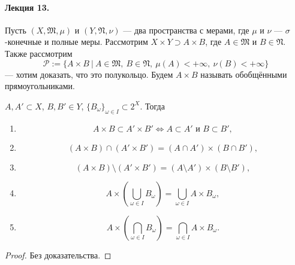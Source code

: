 \paragraph{Лекция 13.}

Пусть $(X, \mathfrak{M}, \mu)$ и $(Y, \mathfrak{N}, \nu)$ — два пространства с мерами, где $\mu$ и $\nu$ — $\sigma$-конечные и полные меры.
Рассмотрим $X \times Y \supset A \times B$, где $A \in \mathfrak{M}$ и $B \in \mathfrak{N}$.
Также рассмотрим
\[\mathcal{P}:=\{A \times B \ | \ A \in \mathfrak{M}, \ B \in \mathfrak{N}, \ \mu(A) < +\infty, \ \nu(B) < +\infty\}\]
— хотим доказать, что это полукольцо.
Будем $A \times B$ называть обобщёнными прямоугольниками.

\begin{lemma}
    $A, A' \subset X$, $B,B' \in Y$, $\{B_\omega\}_{\omega \in I} \subset 2^X$. Тогда
    \begin{enumerate}
        \item \[A \times B \subset A' \times B' \Longleftrightarrow A \subset A' \text{ и } B \subset B',\]
        \item \[(A \times B) \cap (A' \times B') = (A \cap A') \times (B \cap B'),\]
        \item \[(A \times B) \setminus (A' \times B') = (A \setminus A') \times (B \setminus B'),\]
        \item \[A \times \left(\bigcup\limits_{\omega \in I} B_\omega\right) = \bigcup\limits_{\omega \in I} A \times B_\omega,\]
        \item \[A \times \left(\bigcap\limits_{\omega \in I} B_\omega\right) = \bigcap\limits_{\omega \in I} A \times B_\omega.\]
    \end{enumerate}
\end{lemma}
\begin{proof}
    Без доказательства.
\end{proof} 

